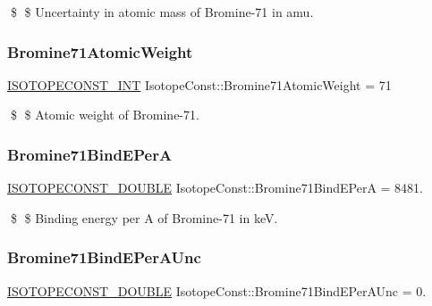 \$ \$ Uncertainty in atomic mass of Bromine-\/71 in amu. \mbox{\label{group___isotope_const-_bromine-_br71_ga82413e5c6e508a8e3e4a0198a7b35f13}} 
\subsubsection{\texorpdfstring{Bromine71\+Atomic\+Weight}{Bromine71AtomicWeight}}
{\footnotesize\ttfamily \mbox{\hyperlink{group___isotope_const-_macros_ga5f18360b3e99483a35c32d789e62621c}{I\+S\+O\+T\+O\+P\+E\+C\+O\+N\+S\+T\+\_\+\+I\+NT}} Isotope\+Const\+::\+Bromine71\+Atomic\+Weight = 71}

\$ \$ Atomic weight of Bromine-\/71. \mbox{\label{group___isotope_const-_bromine-_br71_gac811f1bf8d1737ad416ccb243ed428ba}} 
\subsubsection{\texorpdfstring{Bromine71\+Bind\+E\+PerA}{Bromine71BindEPerA}}
{\footnotesize\ttfamily \mbox{\hyperlink{group___isotope_const-_macros_ga8f45a7272ce02c0b4c65c44636ed719a}{I\+S\+O\+T\+O\+P\+E\+C\+O\+N\+S\+T\+\_\+\+D\+O\+U\+B\+LE}} Isotope\+Const\+::\+Bromine71\+Bind\+E\+PerA = 8481.}

\$ \$ Binding energy per A of Bromine-\/71 in keV. \mbox{\label{group___isotope_const-_bromine-_br71_ga1fce545bc210d9f896e9679179cfa4a9}} 
\subsubsection{\texorpdfstring{Bromine71\+Bind\+E\+Per\+A\+Unc}{Bromine71BindEPerAUnc}}
{\footnotesize\ttfamily \mbox{\hyperlink{group___isotope_const-_macros_ga8f45a7272ce02c0b4c65c44636ed719a}{I\+S\+O\+T\+O\+P\+E\+C\+O\+N\+S\+T\+\_\+\+D\+O\+U\+B\+LE}} Isotope\+Const\+::\+Bromine71\+Bind\+E\+Per\+A\+Unc = 0.}


